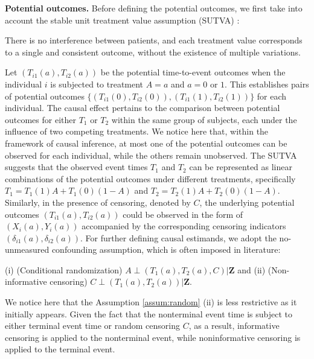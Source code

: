 \documentclass[APA,Times1COL]{WileyNJDv5} %
\theoremstyle{plain}
\def\bfZ{\mathbf{Z}}
\begin{document}
\textbf{Potential outcomes.} Before defining the potential outcomes, we first take into account the stable unit treatment value assumption (SUTVA) \citep{rubin1990comment}:
\begin{assumption}
There is no interference between patients, and each treatment value corresponds to a single and consistent outcome, without the existence of multiple variations.
\label{assum:sutva}
\end{assumption} 
Let $(T_{i1}(a),T_{i2}(a))$ be the potential time-to-event outcomes when the individual $i$ is subjected to treatment $A=a$ and $a=0$ or $1$. This establishes pairs of potential outcomes  $\{(T_{i1}(0),T_{i2}(0)),(T_{i1}(1),T_{i2}(1))\}$ for each individual. 
The causal effect pertains to the comparison between potential outcomes for either $T_1$ or $T_2$ within the same group of subjects, each under the influence of two competing treatments. We notice here that, within the framework of causal inference, at most one of the potential outcomes can be observed for each individual, while the others remain unobserved.  The SUTVA suggests that the observed event times $T_1$ and $T_2$ can be represented as linear combinations of the potential outcomes under different treatments, specifically $T_1=T_1(1)A+T_1(0)(1-A)$ and $T_2 = T_2(1)A+T_2(0)(1-A)$. 
Similarly, in the presence of censoring, denoted by $C$, the underlying potential outcomes $(T_{i1}(a),T_{i2}(a))$ could be observed in the form of $(X_{i}(a),Y_{i}(a))$ accompanied by the corresponding censoring indicators $(\delta_{i1}(a),\delta_{i2}(a))$. 
For further defining causal estimands, we adopt the no-unmeasured confounding assumption, which is often imposed in literature: 
\begin{assumption} 
(i) (Conditional randomization) $A\perp (T_1(a), T_2(a), C)|\bfZ$
and (ii) (Non-informative censoring)  $C\perp (T_1(a), T_2(a))|\bfZ$.
\label{assum:random}
\end{assumption}


We notice here that the Assumption \ref{assum:random} (ii) is less restrictive as it initially appears. Given the fact that the nonterminal event time is subject to either terminal event time or random censoring $C$, as a result, informative censoring is applied to the nonterminal event, while noninformative censoring is applied to the terminal event.
\end{document}
